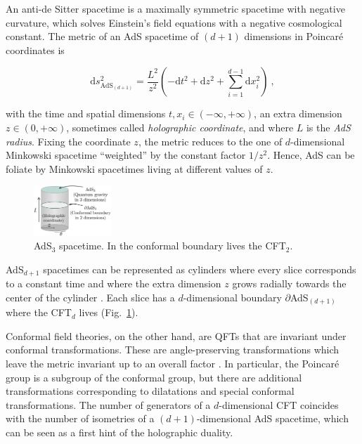 \documentclass[twocolumn]{revtex4}
\providecommand{\eq}[2]{
    \begin{equation}
        #2
    \label{eq:#1}
    \end{equation}
}
\begin{document}
An anti-de Sitter spacetime is a maximally symmetric spacetime with negative curvature, which solves Einstein's field equations with a negative cosmological constant. The metric of an AdS spacetime of $(d+1)$ dimensions in Poincar\'e coordinates is \cite{kaplan_lectures_nodate}
\eq{AdS_PP-metric}{
    \mathrm{d} s_{\text{AdS}_{(d+1)}}^2 = \frac{L^2}{z^2} \left( -\mathrm{d} t^2 + \mathrm{d} z^2 + \sum_{i=1}^{d-1} \mathrm{d} x_i^2 \right) \ ,
}
with the time and spatial dimensions $t , x_i \in (-\infty,+\infty)$, an extra dimension $z \in (0,+\infty)$, sometimes called \textit{holographic coordinate}, and where $L$ is the \textit{AdS radius}. Fixing the coordinate $z$, the metric reduces to the one of $d$-dimensional Minkowski spacetime ``weighted'' by the constant factor $1/z^2$. Hence, AdS can be foliate by Minkowski spacetimes living at different values of $z$.


\begin{figure}
    \centering
    \includegraphics[width=0.26\textwidth]{../imatges/AdS_Cylindric.png}
\caption{AdS$_3$ spacetime. In the conformal boundary lives the CFT$_2$.}
\label{fig:AdS}
\end{figure}

AdS$_{d+1}$ spacetimes can be represented as cylinders where every slice corresponds to a constant time and where the extra dimension $z$ grows radially towards the center of the cylinder \cite{hawking_large_2008}. Each slice has a $d$-dimensional boundary $\partial$AdS$_{(d+1)}$ where the CFT$_d$ lives (Fig.~\ref{fig:AdS}).

Conformal field theories, on the other hand, are QFTs that are invariant under conformal transformations. These are angle-preserving transformations which leave the metric invariant up to an overall factor \cite{ginsparg_applied_1988}. In particular, the Poincar\'e group is a subgroup of the conformal group, but there are additional transformations corresponding to dilatations and special conformal transformations. The number of generators of a $d$-dimensional CFT coincides with the number of isometries of a $(d+1)$-dimensional AdS spacetime, which can be seen as a first hint of the holographic duality.
\end{document}
